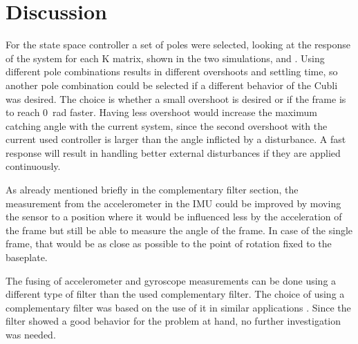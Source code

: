 \chapter{Discussion}

For the state space controller a set of poles were selected, looking at the response of the system for each K matrix, shown in the two simulations,  and . Using different pole combinations results in different overshoots and settling time, so another pole combination could be selected if a different behavior of the Cubli was desired. 
The choice is whether a small overshoot is desired or if the frame is to reach \SI{0}{rad} faster. 
Having less overshoot would increase the maximum catching angle with the current system, since the second overshoot with the current used controller is larger than the angle inflicted by a disturbance. A fast response will result in handling better external disturbances if they are applied continuously.

As already mentioned briefly in the complementary filter section, the measurement from the accelerometer in the IMU could be improved by moving the sensor to a position where it would be influenced less by the acceleration of the frame but still be able to measure the angle of the frame. In case of the single frame, that would be as close as possible to the point of rotation fixed to the baseplate.

The fusing of accelerometer and gyroscope measurements can be done using a different type of filter than the used complementary filter. The choice of using a complementary filter was based on the use of it in similar applications \cite{OlliW}. Since the filter showed a good behavior for the problem at hand, no further investigation was needed.

%

